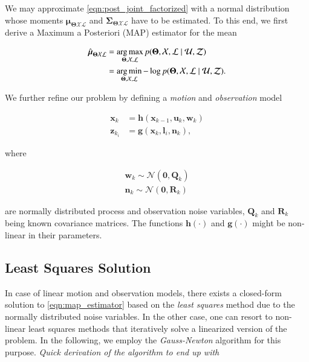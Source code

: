 We may approximate \eqref{eqn:post_joint_factorized} with a normal distribution
whose moments $\boldsymbol{\mu}_{\boldsymbol{\Theta}\mathcal{X}\mathcal{L}}$ and
$\boldsymbol{\Sigma}_{\boldsymbol{\Theta}\mathcal{X}\mathcal{L}}$ have to be
estimated. To this end, we first derive a Maximum a Posteriori (MAP) estimator
for the mean

\begin{equation}\label{eqn:map_estimator}
  \begin{aligned}
  \hat{\boldsymbol{\mu}}_{\boldsymbol{\Theta}\mathcal{X}\mathcal{L}} &=
    \operatorname*{arg\,max}_{\boldsymbol{\Theta},\mathcal{X},\mathcal{L}}
    p(\boldsymbol{\Theta}, \mathcal{X},\mathcal{L} \mid\mathcal{U},\mathcal{Z})
    \\
    &= \operatorname*{arg\,min}_{\boldsymbol{\Theta},\mathcal{X},\mathcal{L}}-\log
    p(\boldsymbol{\Theta}, \mathcal{X},\mathcal{L} \mid\mathcal{U},\mathcal{Z}).
  \end{aligned}
\end{equation}

We further refine our problem by defining a \emph{motion} and \emph{observation}
model

\begin{equation}\label{eqn:process_model}
  \begin{aligned}
  \mathbf{x}_k &= \mathbf{h}(\mathbf{x}_{k-1}, \mathbf{u}_k, \mathbf{w}_k)\\
  \mathbf{z}_{k_i} &= \mathbf{g}(\mathbf{x}_{k}, \mathbf{l}_i, \mathbf{n}_k),
  \end{aligned}
\end{equation}

where

\begin{equation}\label{eqn:noise_model}
  \begin{aligned}
  \mathbf{w}_k \sim \mathcal{N}(\mathbf{0},\mathbf{Q}_k)\\
  \mathbf{n}_k \sim \mathcal{N}(\mathbf{0},\mathbf{R}_k)
  \end{aligned}
\end{equation}

are normally distributed process and observation noise variables,
$\mathbf{Q}_k$ and $\mathbf{R}_k$ being known covariance matrices. The functions
$\mathbf{h}(\cdot)$ and $\mathbf{g}(\cdot)$ might be non-linear in their
parameters.

\subsection{Least Squares Solution}
In case of linear motion and observation models, there exists a closed-form
solution to \eqref{eqn:map_estimator} based on the \emph{least squares} method
due to the normally distributed noise variables. In the other case, one can
resort to non-linear least squares methods that iteratively solve a linearized
version of the problem. In the following, we employ the \emph{Gauss-Newton}
algorithm for this purpose. \textit{Quick derivation of the algorithm to end up with}


